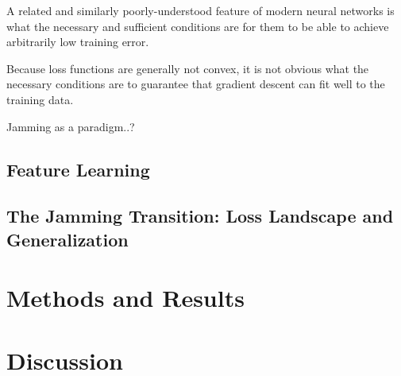 \documentclass[a4paper, 12pt]{article}
\begin{document}
A related and similarly poorly-understood feature of modern neural networks is what the necessary and sufficient conditions are for them to be able to achieve arbitrarily low training error. 

Because loss functions are generally not convex, it is not obvious what the necessary conditions are to guarantee that gradient descent can fit well to the training data. 


Jamming as a paradigm..?

\subsection{Feature Learning}

\subsection{The Jamming Transition: Loss Landscape and Generalization}


\section{Methods and Results}

\section{Discussion}

\printbibliography
\end{document}
